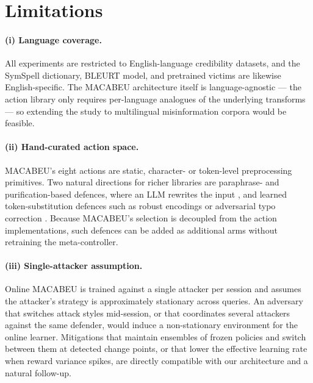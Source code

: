 \documentclass[11pt]{article}
\begin{document}
%

\section*{Limitations}

\paragraph{(i) Language coverage.} All experiments are restricted to English-language credibility datasets, and the SymSpell dictionary, BLEURT model, and pretrained victims are likewise English-specific. The MACABEU architecture itself is language-agnostic --- the action library only requires per-language analogues of the underlying transforms --- so extending the study to multilingual misinformation corpora would be feasible.

\paragraph{(ii) Hand-curated action space.} MACABEU's eight actions are static, character- or token-level preprocessing primitives. Two natural directions for richer libraries are paraphrase- and purification-based defences, where an LLM rewrites the input \citep{Moraffah2024purification, Robey2023smoothllm}, and learned token-substitution defences such as robust encodings \citep{Jones2020robenc} or adversarial typo correction \citep{Pruthi2019combating}. Because MACABEU's selection is decoupled from the action implementations, such defences can be added as additional arms without retraining the meta-controller.

\paragraph{(iii) Single-attacker assumption.} Online MACABEU is trained against a single attacker per session and assumes the attacker's strategy is approximately stationary across queries. An adversary that switches attack styles mid-session, or that coordinates several attackers against the same defender, would induce a non-stationary environment for the online learner. Mitigations that maintain ensembles of frozen policies and switch between them at detected change points, or that lower the effective learning rate when reward variance spikes, are directly compatible with our architecture and a natural follow-up.
\end{document}
